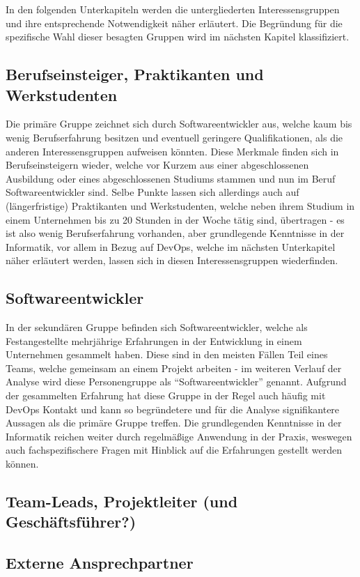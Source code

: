 In den folgenden Unterkapiteln werden die untergliederten Interessensgruppen und ihre entsprechende Notwendigkeit näher erläutert. Die Begründung für die spezifische Wahl dieser besagten Gruppen wird im
nächsten Kapitel klassifiziert.

\subsection{Berufseinsteiger, Praktikanten und Werkstudenten}
Die primäre Gruppe zeichnet sich durch Softwareentwickler aus, welche kaum bis wenig Berufserfahrung besitzen und eventuell geringere Qualifikationen, als die anderen Interessensgruppen aufweisen könnten.
Diese Merkmale finden sich in Berufseinsteigern wieder, welche vor Kurzem aus einer abgeschlossenen Ausbildung oder eines abgeschlossenen Studiums stammen und nun im Beruf Softwareentwickler sind. Selbe Punkte
lassen sich allerdings auch auf (längerfristige) Praktikanten und Werkstudenten, welche neben ihrem Studium in einem Unternehmen bis zu 20 Stunden in der Woche tätig sind, übertragen - es ist also wenig Berufserfahrung
vorhanden, aber grundlegende Kenntnisse in der Informatik, vor allem in Bezug auf DevOps, welche im nächsten Unterkapitel näher erläutert werden, lassen sich in diesen Interessensgruppen wiederfinden.

\subsection{Softwareentwickler}
In der sekundären Gruppe befinden sich Softwareentwickler, welche als Festangestellte mehrjährige Erfahrungen in der Entwicklung in einem Unternehmen gesammelt haben. Diese sind in den meisten Fällen Teil eines Teams, welche gemeinsam an einem Projekt arbeiten
- im weiteren Verlauf der Analyse wird diese Personengruppe als \enquote{Softwareentwickler} genannt. Aufgrund der gesammelten Erfahrung hat diese Gruppe in der Regel auch häufig mit DevOps Kontakt und kann so begründetere und für die Analyse signifikantere
Aussagen als die primäre Gruppe treffen. Die grundlegenden Kenntnisse in der Informatik reichen weiter durch regelmäßige Anwendung in der Praxis, weswegen auch fachspezifischere Fragen mit Hinblick auf die Erfahrungen gestellt werden können.

\subsection{Team-Leads, Projektleiter (und Geschäftsführer?)}

\subsection{Externe Ansprechpartner}